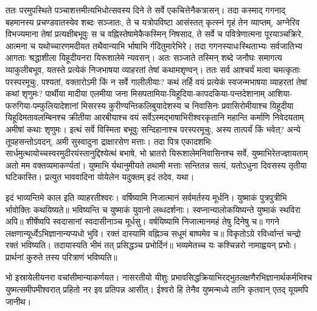 \adhyAya
{}
\vakya ततः परमुपस्थिते पञ्चाशत्तमीत्यभिधोत्सवस्य दिने ते सर्वे एकचित्तेनैकत्रासन्।
\vakya तदा कस्माद् गगनाद् बहमानस्य प्रचण्डवातस्येव शब्दः सञ्जातः, ते च यत्रोपविष्टा आसंस्तत् कृत्स्नं गृहं तेन व्याप्तम्,
\vakya अग्नेरिव विभज्यमाना तेषां प्रत्यक्षीबभूवुः स च वह्निस्तेषामेकैकस्मिन् निषसाद,
\vakya ते सर्वे च पवित्रेणात्मना पूरयाञ्चक्रिरे, आत्मना च यथोच्चारणमदीयत तथैवान्याभि र्भाषाभि र्गदितुमारेभिरे।
\vakya तदा गगनस्याधःस्थिताभ्यः सर्वजातिभ्य आगताः श्रद्धाशीला यिहूदीयनरा यिरूशालेमे न्यवसन्।
\vakya अतः सञ्जाते तस्मिन् शब्दे जनौघः समागत्य व्याकुलीबभूव, यतस्ते प्रत्येकं निजभाषया व्याहरतां तेषां कथामशृण्वन्।
\vakya ततः सर्व आश्चर्यं मत्वा चमत्कृताः परस्परमूचुः, पश्यतां, वक्तारोऽमी किं न सर्वे गालीलीयाः?
\vakya कथं तर्हि वयं प्रत्येकं स्वजन्मभाषया व्याहरतां तेषां कथां शृणुमः?
\vakya पार्थीया मादीया एलमीया जना मिसपतामिया-यिहूदिया-कापदकिया-पन्तदेशानाम् आशिया-फरुगिया-पम्फुलियादेशानां
\vakya मिसरस्य कुरीण्यन्तिकलिबुयादेशस्य च निवासिनः प्रवासिरोमीयाश्च यिहूदीया यिहूदिमतावलम्बिनश्च
\vakya क्रीतीया आरबीयाश्च वयं सर्वेऽस्मद्भाषाभिरीश्वरकृतानि महान्ति कर्माणि निवेदयताम् अमीषां कथाः शृणुमः।
\vakya इत्थं सर्वे विस्मिता बभूवुः सन्दिहानाश्च परस्परमूचुः, अस्य तात्पर्यं किं भवेत्?
\vakya अन्ये तूपहसन्तोऽवदन्, अमी सुस्वादुना द्राक्षारसेण मत्ताः।
\vakya तदा पित्र एकादशभिः सार्धमुत्थायोच्चस्वरमुदीरयंस्तानुद्दिश्येत्थं बभाषे, भो भ्रातरो यिरूशालेमनिवासिनश्च सर्वे, युष्माभिरेतज्ज्ञायताम् अतो मम वक्तव्यमाकर्ण्यतां।
\vakya युष्माभि र्यथानुमीयते तथामी मत्ताः सन्तितन्न सत्यं, यतोऽधुना दिवसस्य तृतीया घटिकास्ति।
\vakya प्रत्युत भाववादिना योयेलेन यदुक्तम् इदं तदेव, यथा।
\begin{poem}
\vakya इदं भाव्यन्तिमे काल इति व्याहरतीश्वरः।
\pline वर्षिष्यामि निजात्मानं सर्वमर्तस्य मूर्धनि।
\pline युष्माकं पुत्रपुत्रीभि र्भावोक्तिः कथयिष्यते॥
\pline भविष्यन्ति च युष्माकं युवानो लब्धदर्शनाः।
\pline स्वप्नान्यालोकयिष्यन्ते युष्माकं स्थविरा अपि॥
\vakya शीर्षेष्वपि स्वदासानां स्वदासीनाञ्च मूर्धसु।
\pline वर्षयिष्यामि निजात्मानमहं तेषु दिनेषु च॥
\vakya गगने लक्षणान्यूर्ध्वेऽभिज्ञानान्यप्यधो भुवि।
\pline रक्तं दास्यामि वह्निञ्च सधूमं बाष्पमेव च॥
\vakya विकृतोऽग्रे रविर्ध्वान्तं चन्द्रो रक्तं भविष्यति।
\pline तदायास्यति भीमं तत् प्रसिद्धञ्च प्रभोर्दिनं॥
\vakya भव्यमेतच्च यः कश्चिन्नरो नामाह्वयन् प्रभोः।
\pline प्रार्थनां कुरुते तस्य परित्राणं भविष्यति॥
\end{poem}
\vakya भो इस्रायेलीयनरा वचांसीमान्याकर्णयत। नासरतीयो यीशुः प्रभावसिद्धक्रियाभिरद्भुतलक्षणैरभिज्ञानार्थकर्मभिश्च युष्मत्समीपमीश्वरात् प्रहितो नर इव प्रतिपन्न आसीत्। ईश्वरो हि तेनैव युष्मन्मध्ये तानि कृतवान् एतद् यूयमपि जानीथ।
